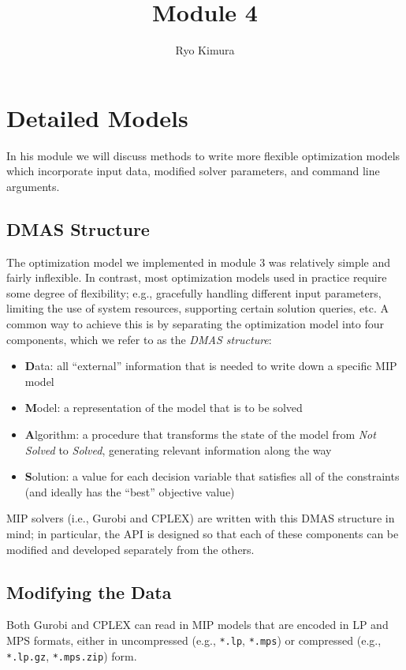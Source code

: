 \documentclass[12pt]{article}
\begin{document}
\title{Module 4}
\author{Ryo Kimura}
\date{}
\maketitle

\setcounter{section}{3}
\section{Detailed Models}
In his module we will discuss methods to write more flexible optimization models which incorporate input data, modified solver parameters, and command line arguments.

\subsection{DMAS Structure}
The optimization model we implemented in module 3 was relatively simple and fairly inflexible. In contrast, most optimization models used in practice require some degree of flexibility; e.g., gracefully handling different input parameters, limiting the use of system resources, supporting certain solution queries, etc. A common way to achieve this is by separating the optimization model into four components, which we refer to as the \emph{DMAS structure}:
\begin{itemize}
    \item \textbf{D}ata: all ``external'' information that is needed to write down a specific MIP model
    \item \textbf{M}odel: a representation of the model that is to be solved
    \item \textbf{A}lgorithm: a procedure that transforms the state of the model from \emph{Not Solved} to \emph{Solved}, generating relevant information along the way
    \item \textbf{S}olution: a value for each decision variable that satisfies all of the constraints (and ideally has the ``best'' objective value)
\end{itemize}
MIP solvers (i.e., Gurobi and CPLEX) are written with this DMAS structure in mind; in particular, the API is designed so that each of these components can be modified and developed separately from the others.

\subsection{Modifying the Data}
Both Gurobi and CPLEX can read in MIP models that are encoded in LP and MPS formats, either in uncompressed (e.g., \texttt{*.lp}, \texttt{*.mps}) or compressed (e.g., \texttt{*.lp.gz}, \texttt{*.mps.zip}) form.
\end{document}
